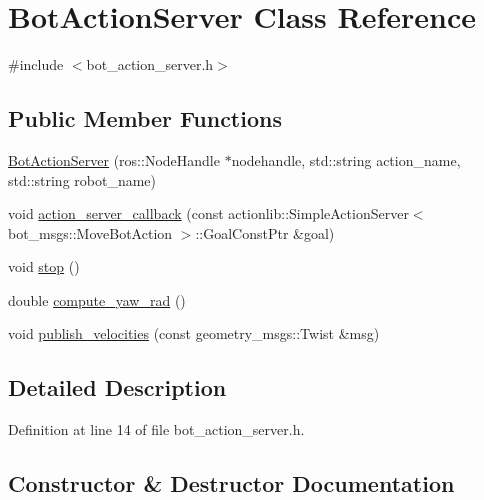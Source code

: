 \hypertarget{class_bot_action_server}{}\section{Bot\+Action\+Server Class Reference}
\label{class_bot_action_server}


{\ttfamily \#include $<$bot\+\_\+action\+\_\+server.\+h$>$}

\subsection*{Public Member Functions}
\begin{DoxyCompactItemize}
\item 
\hyperlink{class_bot_action_server_aab05ee0e99a61687997c358a27555a32}{Bot\+Action\+Server} (ros\+::\+Node\+Handle $\ast$nodehandle, std\+::string action\+\_\+name, std\+::string robot\+\_\+name)
\item 
void \hyperlink{class_bot_action_server_a48f2c8231440b5057b2685c319d83515}{action\+\_\+server\+\_\+callback} (const actionlib\+::\+Simple\+Action\+Server$<$ bot\+\_\+msgs\+::\+Move\+Bot\+Action $>$\+::Goal\+Const\+Ptr \&goal)
\item 
void \hyperlink{class_bot_action_server_a3e91308d1567b72b949cd19c63a808b1}{stop} ()
\item 
double \hyperlink{class_bot_action_server_af24acb7dc4e73c24a4c913fd6a521bf0}{compute\+\_\+yaw\+\_\+rad} ()
\item 
void \hyperlink{class_bot_action_server_a821f9e38243f2b5ffadfbe62aa3ec1b2}{publish\+\_\+velocities} (const geometry\+\_\+msgs\+::\+Twist \&msg)
\end{DoxyCompactItemize}


\subsection{Detailed Description}


Definition at line 14 of file bot\+\_\+action\+\_\+server.\+h.



\subsection{Constructor \& Destructor Documentation}
\mbox{\label{class_bot_action_server_aab05ee0e99a61687997c358a27555a32}} 
